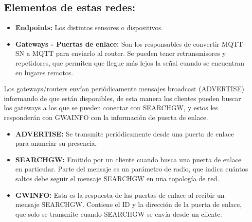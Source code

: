 \documentclass[12pt, twoside, openright]{report} %
\begin{document}
\subsection{Elementos de estas redes:}

\begin{itemize}
	\item \textbf{Endpoints:} Los distintos sensores o dispositivos.
	\item \textbf{Gateways - Puertas de enlace:} Son los responsables de convertir MQTT-SN a MQTT para enviarlo al router. Se pueden tener retransmisores y repetidores, que permiten que llegue más lejos la señal cuando se encuentran en lugares remotos.
\end{itemize}

Los gateways/routers envían periódicamente mensajes broadcast (ADVERTISE) informando de que están disponibles, de esta manera los clientes pueden buscar los gateways a los que se pueden conectar con SEARCHGW, y estos les responderán con GWAINFO con la información de puerta de enlace.
\begin{itemize}
	\item \textbf{ADVERTISE:} Se transmite periódicamente desde una puerta de enlace para anunciar su presencia.
	\item \textbf{SEARCHGW:} Emitido por un cliente cuando busca una puerta de enlace en particular. Parte del mensaje es un parámetro de radio, que indica cuántos saltos debe seguir el mensaje SEARCHGW en una topología de red.
	\item \textbf{GWINFO:} Esta es la respuesta de las puertas de enlace al recibir un mensaje SEARCHGW. Contiene el ID y la dirección de la puerta de enlace, que solo se transmite cuando SEARCHGW se envía desde un cliente.
\end{itemize}
\end{document}

